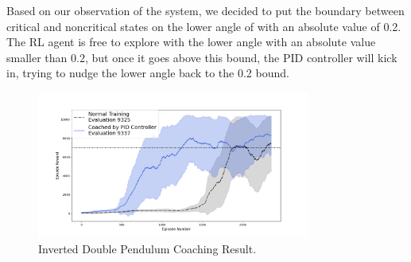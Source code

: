 Based on our observation of the system, we decided to put the boundary between critical and noncritical states on the lower angle of with an absolute value of 0.2. The RL agent is free to explore with the lower angle with an absolute value smaller than 0.2, but once it goes above this bound, the PID controller will kick in, trying to nudge the lower angle back to the 0.2 bound.

\begin{figure}[H]
\centering
\includegraphics[width=0.8\textwidth]{double.png}
\caption{Inverted Double Pendulum Coaching Result.}
\label{fig:double_result}
\end{figure}
